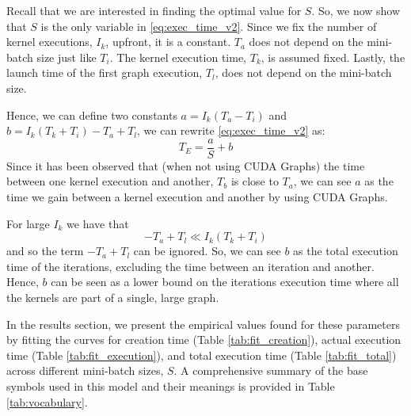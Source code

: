 \documentclass[10pt,twocolumn]{article}
\begin{document}
Recall that we are interested in finding the optimal value for \(S\). So, we now show that \(S\) is the only variable in \ref{eq:exec_time_v2}.
Since we fix the number of kernel executions, \(I_k\), upfront, it is a constant.
\(T_a\) does not depend on the mini-batch size just like \(T_i\).
The kernel execution time, \(T_k\), is assumed fixed.
Lastly, the launch time of the first graph execution, \(T_l\), does not depend on the mini-batch size.

Hence, we can define two constants \(a=I_{k}(T_{a}-T_{i})\) and \(b=I_{k}(T_{k} + T_{i}) - T_{a} + T_{l}\), we can rewrite \ref{eq:exec_time_v2} as:
\begin{equation}
\label{eq:exec_time_v3}
T_E = \frac{a}{S} + b
\end{equation}
Since it has been observed that (when not using CUDA Graphs) the time between one kernel execution and another, \(T_b\) is close to \(T_a\), we can see \(a\) as the time we gain between a kernel execution and another by using CUDA Graphs. 

For large \(I_k\) we have that 
\[-T_a + T_l \ll I_k(T_k + T_i) \]
and so the term \(-T_a + T_l\) can be ignored.
So, we can see \(b\) as the total execution time of the iterations, excluding the time between an iteration and another.
Hence, \(b\) can be seen as a lower bound on the iterations execution time where all the kernels are part of a single, large graph.

In the results section, we present the empirical values found for these parameters by fitting the curves for creation time (Table \ref{tab:fit_creation}), actual execution time (Table \ref{tab:fit_execution}), and total execution time (Table \ref{tab:fit_total}) across different mini-batch sizes, \(S\). A comprehensive summary of the base symbols used in this model and their meanings is provided in Table \ref{tab:vocabulary}.
\end{document}
